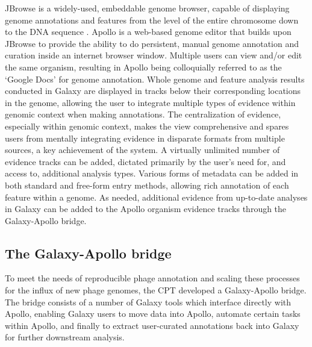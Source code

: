 JBrowse is a widely-used, embeddable genome browser, capable of
displaying genome annotations and features from the level of the entire
chromosome down to the DNA sequence \cite{Buels_2016}. Apollo is a web-based
genome editor that builds upon JBrowse to provide the ability to do
persistent, manual genome annotation and curation inside an internet
browser window. Multiple users can view and/or edit the same organism,
resulting in Apollo being colloquially referred to as the `Google Docs'
for genome annotation. Whole genome and feature analysis results
conducted in Galaxy are displayed in tracks below their corresponding
locations in the genome, allowing the user to integrate multiple types
of evidence within genomic context when making annotations. The
centralization of evidence, especially within genomic context, makes the
view comprehensive and spares users from mentally integrating evidence
in disparate formats from multiple sources, a key achievement of the
system. A virtually unlimited number of evidence tracks can be added,
dictated primarily by the user's need for, and access to, additional
analysis types. Various forms of metadata can be added in both standard
and free-form entry methods, allowing rich annotation of each feature
within a genome. As needed, additional evidence from up-to-date analyses
in Galaxy can be added to the Apollo organism evidence tracks through
the Galaxy-Apollo bridge.

\subsection*{The Galaxy-Apollo bridge}

To meet the needs of reproducible phage annotation and scaling these
processes for the influx of new phage genomes, the CPT developed a
Galaxy-Apollo bridge. The bridge consists of a number of Galaxy tools
which interface directly with Apollo, enabling Galaxy users to move data
into Apollo, automate certain tasks within Apollo, and finally to
extract user-curated annotations back into Galaxy for further downstream
analysis.

